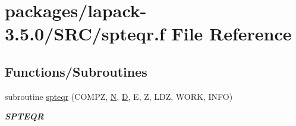 \hypertarget{spteqr_8f}{}\section{packages/lapack-\/3.5.0/\+S\+R\+C/spteqr.f File Reference}
\label{spteqr_8f}
\subsection*{Functions/\+Subroutines}
\begin{DoxyCompactItemize}
\item 
subroutine \hyperlink{group__realPTcomputational_ga72b5ecbbf9359796ae9368a141d2540c}{spteqr} (C\+O\+M\+P\+Z, \hyperlink{polmisc_8c_a0240ac851181b84ac374872dc5434ee4}{N}, \hyperlink{odrpack_8h_a7dae6ea403d00f3687f24a874e67d139}{D}, E, Z, L\+D\+Z, W\+O\+R\+K, I\+N\+F\+O)
\begin{DoxyCompactList}\small\item\em {\bfseries S\+P\+T\+E\+Q\+R} \end{DoxyCompactList}\end{DoxyCompactItemize}
